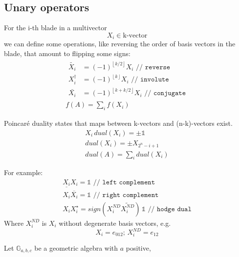 \documentclass[twoside]{article}
\newcommand{\T}[1]{\textrm{#1}} %
\newcommand{\plusminus}{\pm}
\newcommand{\floor}[1]{{\left\lfloor{#1}\right\rfloor}}
\begin{document}
\begin{multicols*}{2}
        \section{Unary operators}
            \par
                For the i-th blade in a multivector
                $$ X_i \in \T{k-vector} $$
                we can define some operations, like reversing the order of
                basis vectors in the blade, that amount to flipping some signs:
                \begin{gather*}
                    \begin{aligned}
                        \tilde{X_i} &= (-1)^\floor{k/2} X_i \texttt{ // reverse} \\
                        X_i^\dagger &= (-1)^\floor{k} X_i \texttt{ // involute} \\
                        \bar{X_i} &= (-1)^\floor{k+k/2} X_i \texttt{ // conjugate}
                    \end{aligned} \\
                    f(A) = \sum_i f(X_i)
                \end{gather*}
            \par
                Poincaré duality states that maps between k-vectors and (n-k)-vectors exist.
                \begin{gather*}
                    X_i \, dual(X_i) = \plusminus \mathbb{1} \\
                    dual(X_i) = \plusminus X_{2^n-i+1} \\
                    dual(A) = \sum_i dual(X_i)
                \end{gather*}
            \par
                For example:
                \begin{gather*}
                    \underline{X_i} X_i = \mathbb{1} \texttt{ // left complement} \\
                    X_i \overline{X_i} = \mathbb{1} \texttt{ // right complement} \\
                    X_i X_i^\star = sign(X^{ND}_i \widetilde{X^{ND}_i}) \, \mathbb{1} \texttt{ // hodge dual}
                \end{gather*}
                Where $ X^{ND}_i $ is $ X_i $ without degenerate basis vectors, e.g.
                $$ X_i = e_{012}; \, X^{ND}_i = e_{12} $$
            \par
                Let $ \mathbb{G}_{a,b,c} $ be a geometric algebra with $ a $ positive,

\end{multicols*}
\end{document}
